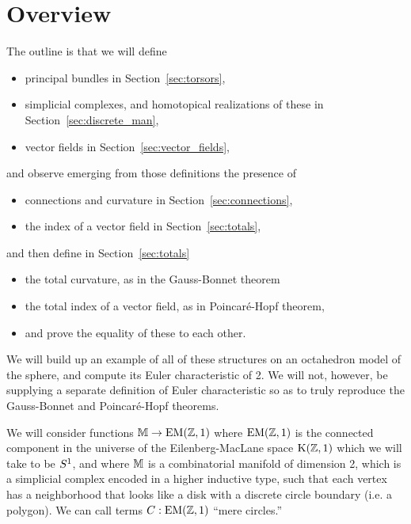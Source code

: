\section{Overview}

The outline is that we will define 
\begin{itemize}
\item principal bundles in Section~\ref{sec:torsors},
\item simplicial complexes, and homotopical realizations of these in Section~\ref{sec:discrete_man},
\item vector fields in Section~\ref{sec:vector_fields},
\end{itemize}
and observe emerging from those definitions the presence of
\begin{itemize}
\item connections and curvature in Section~\ref{sec:connections},
\item the index of a vector field in Section~\ref{sec:totals},
\end{itemize}
and then define in Section~\ref{sec:totals}
\begin{itemize}
\item the total curvature, as in the Gauss-Bonnet theorem
\item the total index of a vector field, as in Poincaré-Hopf theorem,
\item and prove the equality of these to each other.
\end{itemize}

We will build up an example of all of these structures on an octahedron model of the sphere, and compute its Euler characteristic of 2. We will not, however, be supplying a separate definition of Euler characteristic so as to truly reproduce the Gauss-Bonnet and Poincaré-Hopf theorems.

We will consider functions \( \mathbb{M}\to \mathrm{EM}(\mathbb{Z},1) \) where \( \mathrm{EM}(\mathbb{Z},1) \) is the connected component in the universe of the Eilenberg-MacLane space \( \mathrm{K}(\mathbb{Z},1) \) which we will take to be \( S^1 \), and where \( \mathbb{M} \) is a combinatorial manifold of dimension 2, which is a simplicial complex encoded in a higher inductive type, such that each vertex has a neighborhood that looks like a disk with a discrete circle boundary (i.e. a polygon). We can call terms \( C:\mathrm{EM}(\mathbb{Z},1) \) ``mere circles.''

